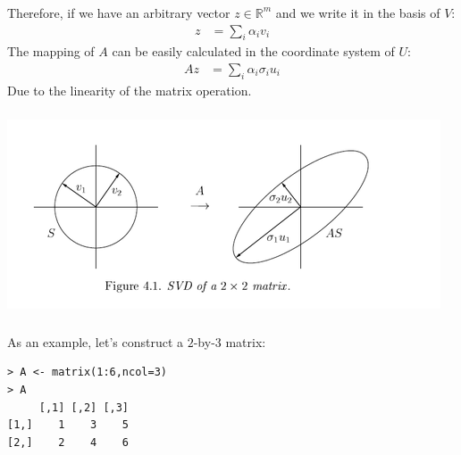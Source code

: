 \begin{frame}[fragile] \frametitle{}

Therefore, if we have an arbitrary vector $z \in \mathbb{R}^m$
and we write it in the basis of $V$:
\begin{align*}
z &= \sum_i \alpha_i v_i
\end{align*}
The mapping of $A$ can be easily calculated in the coordinate system
of $U$:
\begin{align*}
Az &= \sum_i \alpha_i \sigma_i u_i
\end{align*}
Due to the linearity of the matrix operation.

\end{frame}

\begin{frame}[fragile] \frametitle{}

\begin{center}
\includegraphics[width=\textwidth]{img/svd_2d.png}
\end{center}

\end{frame}


\begin{frame}[fragile] \frametitle{}

As an example, let's construct a $2$-by-$3$ matrix:

\begin{verbatim}
> A <- matrix(1:6,ncol=3)
> A
     [,1] [,2] [,3]
[1,]    1    3    5
[2,]    2    4    6
\end{verbatim}

\end{frame}

